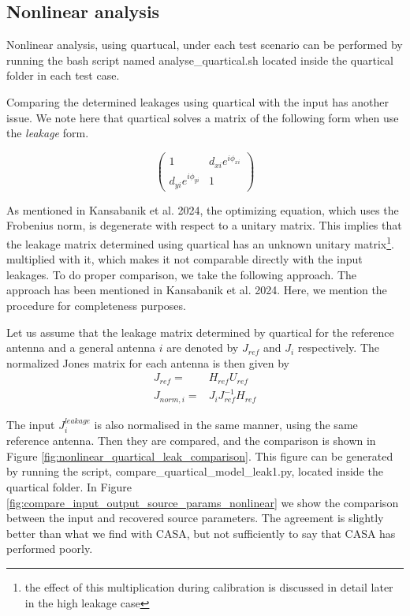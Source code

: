 \documentclass{article}
\begin{document}
\subsection{Nonlinear analysis}

Nonlinear analysis, using quartucal, under each test scenario can be performed by running the bash script named analyse\_quartical.sh located inside the quartical folder in each test case. 

Comparing the determined leakages using quartical with the input has another issue. We note here that quartical solves a matrix of the following form when use the {\it{leakage}} form.

$$
\begin{pmatrix}
1 & d_{xi}e^{i\phi_{xi}} \\
d_{yi}e^{i\phi_{yi}} & 1 
\end{pmatrix}
$$

 As mentioned in Kansabanik et al. 2024, the optimizing equation, which uses the Frobenius norm, is degenerate with respect to a unitary matrix. This implies that the leakage matrix determined using quartical has an unknown unitary matrix\footnote{the effect of this multiplication during calibration is discussed in detail later in the high leakage case}. multiplied with it, which makes it not comparable directly with the input leakages. To do proper comparison, we take the following approach. The approach has been mentioned in Kansabanik et al. 2024. Here, we mention the procedure for completeness purposes.

Let us assume that the leakage matrix determined by quartical for the reference antenna and a general antenna $i$ are denoted by $J_{ref}$ and $J_i$ respectively. The normalized Jones matrix for each antenna is then given by 
\begin{align}
J_{ref}=&H_{ref}U_{ref}\\
J_{norm,i}=&J_i J_{ref}^{-1}H_{ref}
\end{align}

The input $J^{leakage}_i$ is also normalised in the same manner, using the same reference antenna. Then they are compared, and the comparison is shown in Figure \ref{fig:nonlinear_quartical_leak_comparison}. This figure can be generated by running the script, compare\_quartical\_model\_leak1.py, located inside the quartical folder. In Figure \ref{fig:compare_input_output_source_params_nonlinear} we show the comparison between the input and recovered source parameters. The agreement is slightly better than what we find with CASA, but not sufficiently to say that CASA has performed poorly.
\end{document}
